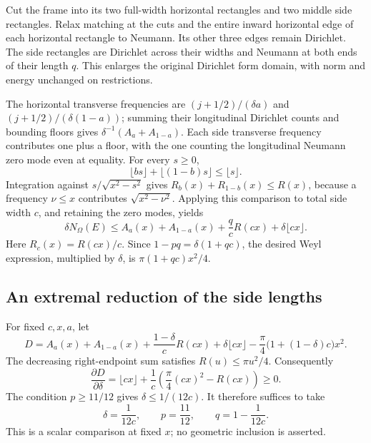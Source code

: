 \documentclass[11pt,reqno]{amsart}
\numberwithin{equation}{section}
\newcommand{\Om}{\Omega}
\begin{document}
Cut the frame into its two full-width horizontal rectangles and
two middle side rectangles. Relax matching at the cuts and the
entire inward horizontal edge of each horizontal rectangle to
Neumann. Its other three edges remain Dirichlet. The side
rectangles are Dirichlet across their widths and Neumann at both
ends of their length $q$. This enlarges the original Dirichlet
form domain, with norm and energy unchanged on restrictions.

The horizontal transverse frequencies are
$(j+1/2)/(\delta a)$ and $(j+1/2)/(\delta(1-a))$; summing
their longitudinal Dirichlet counts and bounding floors gives
$\delta^{-1}(A_a+A_{1-a})$. Each side transverse frequency
contributes one plus a floor, with the one counting the
longitudinal Neumann zero mode even at equality.
For every $s\ge0$,
\[
 \lfloor bs\rfloor+\lfloor(1-b)s\rfloor\le\lfloor s\rfloor.
\]
Integration against $s/\sqrt{x^2-s^2}$ gives
$R_b(x)+R_{1-b}(x)\le R(x)$, because a frequency $\nu\le x$
contributes $\sqrt{x^2-\nu^2}$. Applying this comparison to
total side width $c$, and retaining the zero modes, yields
\begin{equation}\label{eq:rect-mixed}
 \delta N_\Om(E)\le
 A_a(x)+A_{1-a}(x)+\frac q cR(cx)+\delta\lfloor cx\rfloor.
\end{equation}
Here $R_c(x)=R(cx)/c$. Since $1-pq=\delta(1+qc)$, the
desired Weyl expression, multiplied by $\delta$, is
$\pi(1+qc)x^2/4$.

\subsection*{An extremal reduction of the side lengths}

For fixed $c,x,a$, let
\begin{equation}\label{eq:rect-D}
 D=A_a(x)+A_{1-a}(x)+\frac{1-\delta}{c}R(cx)
       +\delta\lfloor cx\rfloor
       -\frac\pi4\bigl(1+(1-\delta)c\bigr)x^2.
\end{equation}
The decreasing right-endpoint sum satisfies $R(u)\le\pi u^2/4$.
Consequently
\[
 \frac{\partial D}{\partial\delta}
 =\lfloor cx\rfloor+\frac1c\left(\frac\pi4(cx)^2-R(cx)\right)
 \ge0.
\]
The condition $p\ge11/12$ gives $\delta\le1/(12c)$.
It therefore suffices to take
\begin{equation}\label{eq:rect-worst}
 \delta=\frac1{12c},\qquad p=\frac{11}{12},
 \qquad q=1-\frac1{12c}.
\end{equation}
This is a scalar comparison at fixed $x$; no geometric inclusion
is asserted.
\end{document}
